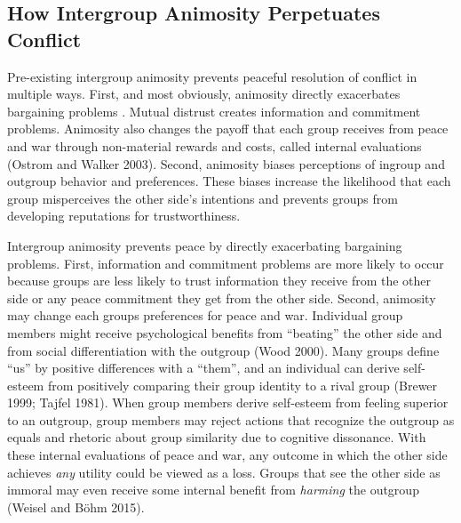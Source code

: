 \documentclass[11pt]{article}
\begin{document}
\subsection{How Intergroup Animosity Perpetuates
Conflict}\label{how-intergroup-animosity-perpetuates-conflict}

Pre-existing intergroup animosity prevents peaceful resolution of
conflict in multiple ways. First, and most obviously, animosity directly
exacerbates bargaining problems . Mutual distrust creates information
and commitment problems. Animosity also changes the payoff that each
group receives from peace and war through non-material rewards and
costs, called internal evaluations (Ostrom and Walker 2003). Second,
animosity biases perceptions of ingroup and outgroup behavior and
preferences. These biases increase the likelihood that each group
misperceives the other side's intentions and prevents groups from
developing reputations for trustworthiness.

Intergroup animosity prevents peace by directly exacerbating bargaining
problems. First, information and commitment problems are more likely to
occur because groups are less likely to trust information they receive
from the other side or any peace commitment they get from the other
side. Second, animosity may change each groups preferences for peace and
war. Individual group members might receive psychological benefits from
``beating'' the other side and from social differentiation with the
outgroup (Wood 2000). Many groups define ``us'' by positive differences
with a ``them'', and an individual can derive self-esteem from
positively comparing their group identity to a rival group (Brewer 1999;
Tajfel 1981). When group members derive self-esteem from feeling
superior to an outgroup, group members may reject actions that recognize
the outgroup as equals and rhetoric about group similarity due to
cognitive dissonance. With these internal evaluations of peace and war,
any outcome in which the other side achieves \emph{any} utility could be
viewed as a loss. Groups that see the other side as immoral may even
receive some internal benefit from \emph{harming} the outgroup (Weisel
and Böhm 2015).
\end{document}
